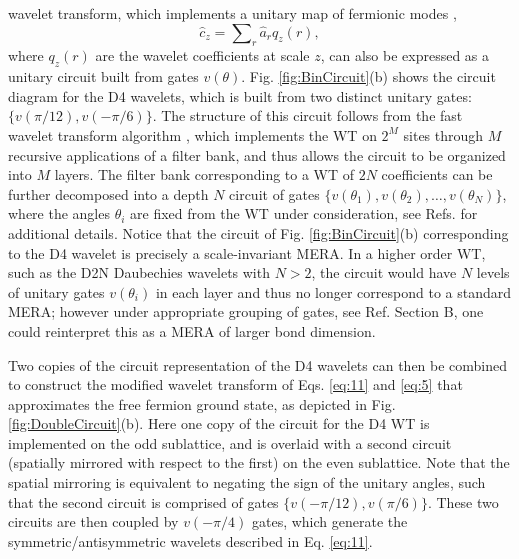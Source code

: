 \documentclass[aps,prl,twocolumn,showpacs,superscriptaddress,floatfix,10pt]{revtex4-1}
\begin{document}
wavelet transform, which implements a unitary map of fermionic modes
\cite{WaveNorm}, \begin{equation}
{\hat c_z} = \sum\nolimits_r {{{\hat a}_r}{q_z}(r)}, \label{eq:15}
\end{equation}
where ${q_z}(r)$ are the wavelet coefficients at scale $z$, can also be expressed as a unitary circuit built from gates $v(\theta)$. 
Fig. \ref{fig:BinCircuit}(b) shows the circuit diagram for the D4 wavelets, which is built from two distinct unitary gates: $\{v(\pi/12), v(-\pi/6) \}$. The structure of this circuit follows from the fast wavelet transform algorithm \cite{FWT}, which implements the WT on $2^M$ sites through $M$ recursive applications of a filter bank, and thus allows the circuit to be organized into $M$ layers. The filter bank corresponding to a WT of $2N$ coefficients can be further decomposed into a depth $N$ circuit of gates $\{v(\theta_1), v(\theta_2),\ldots, v(\theta_N)\}$, where the angles $\theta_i$ are fixed from the WT under consideration, see Refs.\cite{MattWavelet, LongWavelet} for additional details. Notice that the circuit of 
Fig. \ref{fig:BinCircuit}(b) corresponding to the D4 wavelet is precisely a scale-invariant MERA. In a higher order WT, such as the D2N Daubechies wavelets with $N>2$, the circuit would have $N$ levels of unitary gates $v(\theta_i)$ in each layer and thus no longer correspond to a standard MERA; however under appropriate grouping of gates, see Ref.\cite{Supp} Section B, one could reinterpret this as a MERA of larger bond dimension. 

Two copies of the circuit representation of the D4 wavelets can then be
combined to construct the modified wavelet transform of Eqs. \ref{eq:11} and
\ref{eq:5} that approximates the free fermion ground state, as depicted in
Fig. \ref{fig:DoubleCircuit}(b). Here one copy of the circuit for the D4
WT is implemented on the odd sublattice, and is overlaid with a second
circuit (spatially mirrored with respect to the first) on the even sublattice.
Note that the spatial mirroring is equivalent to negating the sign of the
unitary angles, such that the second circuit is comprised of gates
$\{v(-\pi/12), v(\pi/6) \}$. These two circuits are then coupled by $v(-\pi/4)$
gates, which generate the symmetric/antisymmetric wavelets described in Eq.  \ref{eq:11}.
\end{document}
